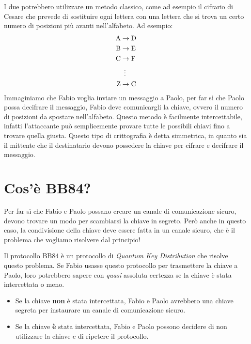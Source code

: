 \documentclass[a4paper]{article}
\begin{document}
I due potrebbero utilizzare un metodo classico, come ad esempio il cifrario di Cesare che
prevede di sostituire ogni lettera con una lettera che si trova un certo numero di posizioni
più avanti nell'alfabeto. Ad esempio:
\[
\begin{aligned}
    \text{A} & \rightarrow \text{D} \\
    \text{B} & \rightarrow \text{E} \\
    \text{C} & \rightarrow \text{F} \\
             & \hspace{0.5em}\vdots \\
    \text{Z} & \rightarrow \text{C}
\end{aligned}
\] 
Immaginiamo che Fabio voglia inviare un messaggio a Paolo, per far sì che Paolo
possa decifrare il messaggio, Fabio deve comunicargli la chiave, ovvero il numero
di posizioni da spostare nell'alfabeto. Questo metodo è facilmente intercettabile,
infatti l'attaccante può semplicemente provare tutte le possibili chiavi fino a trovare
quella giusta. Questo tipo di crittografia è detta simmetrica, in quanto sia il mittente
che il destinatario devono possedere la chiave per cifrare e decifrare il messaggio.

\section{Cos'è BB84?}
Per far sì che Fabio e Paolo possano creare un canale di comunicazione sicuro, devono
trovare un modo per scambiarsi la chiave in segreto. Però anche in questo caso, la 
condivisione della chiave deve essere fatta in un canale sicuro, che è il problema
che vogliamo risolvere dal principio!

Il protocollo BB84 è un protocollo di \textit{Quantum Key Distribution} che risolve questo
problema. Se Fabio usasse questo protocollo per trasmettere la chiave a Paolo, loro
potrebbero sapere con \textit{quasi} assoluta certezza se la chiave è stata intercettata o
meno.
\begin{itemize}
  \item Se la chiave \textbf{non} è stata intercettata, Fabio e Paolo avrebbero una chiave
    segreta per instaurare un canale di comunicazione sicuro.

  \item Se la chiave \textbf{è} stata intercettata, Fabio e Paolo possono decidere di non
    utilizzare la chiave e di ripetere il protocollo.
\end{itemize}
\end{document}
